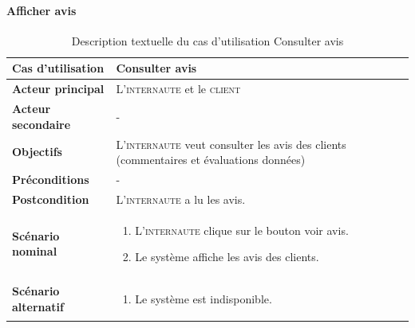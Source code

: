         \paragraph[Consulter avis]{Afficher avis}
            \begin{longtable}{p{4cm} p{9cm}}
                \caption{Description textuelle du cas d’utilisation Consulter avis}
                \label{table:usecaseConsulterAvis}
                \\\hline\hline
                    \textbf{Cas d’utilisation} & \textbf{Consulter avis}
                \\\hline\hline
                        \textbf{Acteur principal} & L’\textsc{internaute} et le \textsc{client}
                    \\
                        \textbf{Acteur secondaire} & -
                    \\
                        \textbf{Objectifs} & L’\textsc{internaute} veut consulter les
                        avis des clients (commentaires et évaluations données)
                    \\
                        \textbf{Préconditions} & -
                    \\
                    \textbf{Postcondition} & L’\textsc{internaute} a lu les avis.
                    \\
                    \textbf{Scénario nominal} &
                        \begin{enumerate}[leftmargin=*]
                            \item L’\textsc{internaute} clique sur le bouton
                            voir avis.
                            \item Le système affiche les avis des clients.
                        \end{enumerate}
                    \\
                    \textbf{Scénario alternatif} &
                        \begin{enumerate}[leftmargin=*]
                            \item Le système est indisponible.
                        \end{enumerate}
                \\\bottomrule
            \end{longtable}


